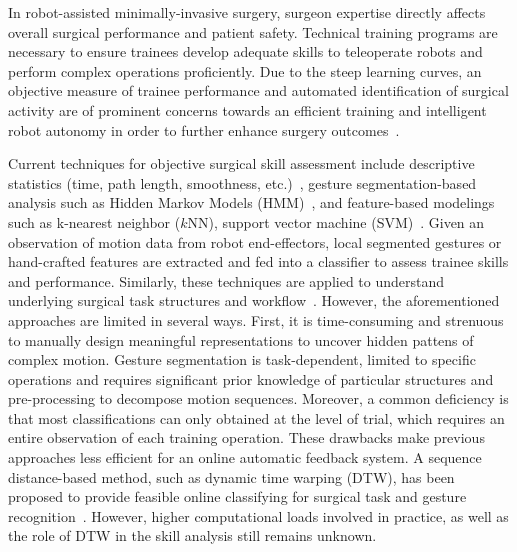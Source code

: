\documentclass[letterpaper, 10 pt, conference, twoside]{IEEEtran}
\begin{document}
In robot-assisted minimally-invasive surgery, surgeon expertise directly affects overall surgical performance and patient safety. Technical training programs are necessary to ensure trainees develop adequate skills to teleoperate robots and perform complex operations proficiently. 
Due to the steep learning curves, an objective measure of trainee performance and automated identification of surgical activity are of prominent concerns towards an efficient training and intelligent robot autonomy in order to further enhance surgery outcomes~\cite{reiley2011objective,kassahun2016surgical}.  

Current techniques for objective surgical skill assessment include descriptive statistics (time, path length, smoothness, etc.)~\cite{nisky2013effect,ershad2016meaningful}, gesture segmentation-based analysis such as Hidden Markov Models (HMM)~\cite{tao2012sparse}, and feature-based modelings such as k-nearest neighbor ($k$NN), support vector machine (SVM)~\cite{forestier2017jigsaw}. 
Given an observation of motion data from robot end-effectors, local segmented gestures or hand-crafted features are extracted and fed into a classifier to assess trainee skills and performance.
Similarly, these techniques are applied to understand underlying surgical task structures and workflow~\cite{reiley2008automatic}. However, the aforementioned approaches are limited in several ways. First, it is time-consuming and strenuous to manually design meaningful representations to uncover hidden pattens of complex motion. Gesture segmentation is task-dependent, limited to specific operations and requires significant prior knowledge of particular structures and pre-processing to decompose motion sequences. Moreover, a common deficiency is that most classifications can only obtained at the level of trial, which requires an entire observation of each training operation. These drawbacks make previous approaches less efficient for an online automatic feedback system. A sequence distance-based method, such as dynamic time warping (DTW), has been proposed to provide feasible online classifying for surgical task and gesture recognition~\cite{fard2017distance}. However, higher computational loads involved in practice, as well as the role of DTW in the skill analysis still remains unknown.
 
\end{document}
